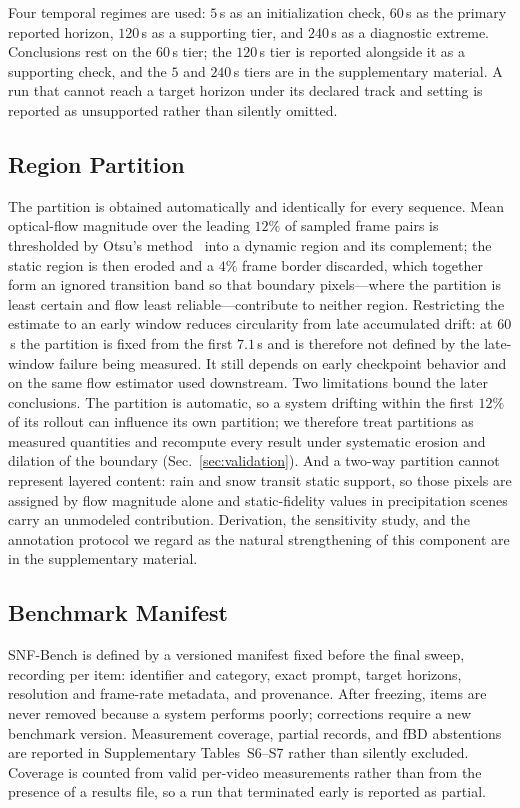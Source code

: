 Four temporal regimes are used: $5$\,s as an initialization check, $60$\,s as the primary reported horizon, $120$\,s as a supporting tier, and $240$\,s as a diagnostic extreme. Conclusions rest on the $60$\,s tier; the $120$\,s tier is reported alongside it as a supporting check, and the $5$ and $240$\,s tiers are in the supplementary material. A run that cannot reach a target horizon under its declared track and setting is reported as unsupported rather than silently omitted.

\subsection{Region Partition}
\label{sec:masks}
The partition is obtained automatically and identically for every sequence. Mean optical-flow magnitude over the leading $12\%$ of sampled frame pairs is thresholded by Otsu's method~\cite{otsu1979threshold} into a dynamic region and its complement; the static region is then eroded and a $4\%$ frame border discarded, which together form an ignored transition band so that boundary pixels---where the partition is least certain and flow least reliable---contribute to neither region. Restricting the estimate to an early window reduces circularity from late accumulated drift: at $60$\,s the partition is fixed from the first $7.1$\,s and is therefore not defined by the late-window failure being measured. It still depends on early checkpoint behavior and on the same flow estimator used downstream. Two limitations bound the later conclusions. The partition is automatic, so a system drifting within the first $12\%$ of its rollout can influence its own partition; we therefore treat partitions as measured quantities and recompute every result under systematic erosion and dilation of the boundary (Sec.~\ref{sec:validation}). And a two-way partition cannot represent layered content: rain and snow transit static support, so those pixels are assigned by flow magnitude alone and static-fidelity values in precipitation scenes carry an unmodeled contribution. Derivation, the sensitivity study, and the annotation protocol we regard as the natural strengthening of this component are in the supplementary material.

\subsection{Benchmark Manifest}
\label{sec:manifest}
SNF-Bench is defined by a versioned manifest fixed before the final sweep, recording per item: identifier and category, exact prompt, target horizons, resolution and frame-rate metadata, and provenance. After freezing, items are never removed because a system performs poorly; corrections require a new benchmark version. Measurement coverage, partial records, and fBD abstentions are reported in Supplementary Tables~S6--S7 rather than silently excluded. Coverage is counted from valid per-video measurements rather than from the presence of a results file, so a run that terminated early is reported as partial.
